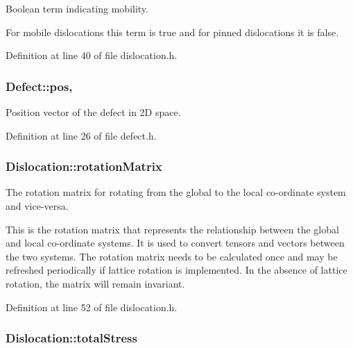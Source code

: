 Boolean term indicating mobility. 

For mobile dislocations this term is true and for pinned dislocations it is false. 

Definition at line 40 of file dislocation.\-h.

\hypertarget{classDefect_aed2731c1beefc22e3db6ad5b18194cdd}{
\subsubsection[{pos}]{ Defect\-::pos\hspace{0.3cm}{\ttfamily [protected]}, {\ttfamily [inherited]}}}\label{d5/d4f/classDefect_aed2731c1beefc22e3db6ad5b18194cdd}


Position vector of the defect in 2\-D space. 



Definition at line 26 of file defect.\-h.

\hypertarget{classDislocation_a5699d2984949af836396c8b7e5f21a5e}{
\subsubsection[{rotation\-Matrix}]{ Dislocation\-::rotation\-Matrix\hspace{0.3cm}{\ttfamily [protected]}}}\label{d3/dc6/classDislocation_a5699d2984949af836396c8b7e5f21a5e}


The rotation matrix for rotating from the global to the local co-\/ordinate system and vice-\/versa. 

This is the rotation matrix that represents the relationship between the global and local co-\/ordinate systems. It is used to convert tensors and vectors between the two systems. The rotation matrix needs to be calculated once and may be refreshed periodically if lattice rotation is implemented. In the absence of lattice rotation, the matrix will remain invariant. 

Definition at line 52 of file dislocation.\-h.

\hypertarget{classDislocation_ae27176c0d47fec3e188d7caa4c52f366}{
\subsubsection[{total\-Stress}]{ Dislocation\-::total\-Stress\hspace{0.3cm}{\ttfamily [protected]}}}\label{d3/dc6/classDislocation_ae27176c0d47fec3e188d7caa4c52f366}


